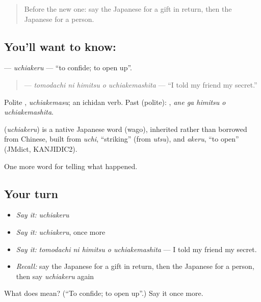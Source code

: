 \label{lesson:JA-C309-uchiakeru}



\begin{quote}
Before the new one: say the Japanese for a gift in return, then the Japanese for a person.
\end{quote}

\subsection*{You'll want to know: }
\textbf{} — \emph{uchiakeru} — \textquotedblleft{}to confide; to open up\textquotedblright{}.

\begin{quote}
\textbf{  } — \emph{tomodachi ni himitsu o uchiakemashita} — \textquotedblleft{}I told my friend my secret.\textquotedblright{}
\end{quote}

Polite \textbf{}, \emph{uchiakemasu}; an ichidan verb. Past (polite): \textbf{  }, \emph{ane ga himitsu o uchiakemashita}.

\begin{cousinweb}
\textbf{} (\emph{uchiakeru}) is a native Japanese word (wago), inherited rather than borrowed from Chinese, built from \emph{uchi}, \textquotedblleft{}striking\textquotedblright{} (from \emph{utsu}), and \emph{akeru}, \textquotedblleft{}to open\textquotedblright{} (JMdict, KANJIDIC2).
\end{cousinweb}

\begin{grammarlens}[title={What you've built}]
One more word for telling what happened.
\end{grammarlens}

\subsection*{Your turn}
\begin{itemize}
\raggedright
  \item \emph{Say it:} \emph{uchiakeru}
  \item \emph{Say it:} \emph{uchiakeru}, once more
  \item \emph{Say it:} \emph{tomodachi ni himitsu o uchiakemashita} — I told my friend my secret.
  \item \emph{Recall:} say the Japanese for a gift in return, then the Japanese for a person, then say \emph{uchiakeru} again
\end{itemize}

\begin{tcolorbox}[breakable,colback=teal!4,colframe=teal!35!black,title={Before you move on}]
What does  mean? (\textquotedblleft{}To confide; to open up\textquotedblright{}.) Say it once more.
\end{tcolorbox}

